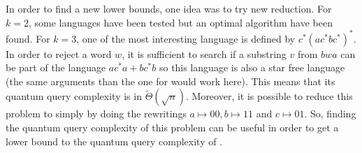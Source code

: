 In order to find a new lower bounds, one idea was to try new reduction.
For $k=2$, some languages have been tested but an optimal algorithm
have been found. For $k=3$, one of the most interesting language is defined
by $c^*(ac^*bc^*)^*$.
In order to reject a word $w$, it is sufficient to search if a substring $v$
from $bwa$ can be part of the language $ac^*a+bc^*b$ so this language is also
a star free language (the same arguments than the one for  would work here).
This means that its quantum query complexity is in $\tilde{\Theta}(\sqrt{n})$.
Moreover, it is possible to reduce this problem to  simply by doing
the rewritings $a \mapsto 00, b\mapsto 11$ and $c \mapsto 01$. So, finding the
quantum query complexity of this problem can be useful in order to get a lower
bound to the quantum query complexity of .
